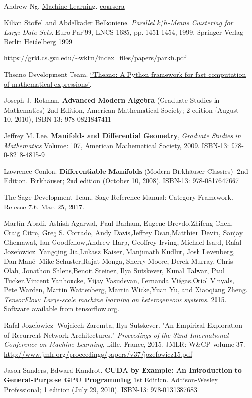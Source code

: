 \documentclass[10pt]{amsart}
\begin{document}
\begin{thebibliography}{9}
Andrew Ng.  \href{https://www.coursera.org/learn/machine-learning/home/welcome}{Machine Learning}.  \href{https://www.coursera.org}{coursera}


Kilian Stoffel and Abdelkader Belkoniene.  \emph{Parallel $k/h$-Means Clustering for Large Data Sets}.  Euro-Par'99, LNCS 1685, pp. 1451-1454, 1999.  Springer-Verlag Berlin Heidelberg 1999

\url{https://grid.cs.gsu.edu/~wkim/index_files/papers/parkh.pdf}

Theano Development Team. \href{http://arxiv.org/pdf/1605.02688.pdf}{“Theano: A Python framework for fast computation of mathematical expressions”}. 

Joseph J. Rotman, \textbf{Advanced Modern Algebra} (Graduate Studies in Mathematics) 2nd Edition, American Mathematical Society; 2 edition (August 10, 2010), ISBN-13: 978-0821847411

Jeffrey M. Lee. \textbf{Manifolds and Differential Geometry}, \emph{Graduate Studies in Mathematics} Volume: 107, American Mathematical Society, 2009. ISBN-13: 978-0-8218-4815-9

Lawrence Conlon.  \textbf{Differentiable Manifolds} (Modern Birkhäuser Classics).  2nd Edition.  Birkhäuser; 2nd edition (October 10, 2008).  ISBN-13: 978-0817647667

The Sage Development Team.  Sage Reference Manual: Category Framework.  Release 7.6.  Mar. 25, 2017.  

Martín Abadi, Ashish Agarwal, Paul Barham, Eugene Brevdo,Zhifeng Chen, Craig Citro, Greg S. Corrado, Andy Davis,Jeffrey Dean,Matthieu Devin, Sanjay Ghemawat, Ian Goodfellow,Andrew Harp, Geoffrey Irving, Michael Isard, Rafal Jozefowicz, Yangqing Jia,Lukasz Kaiser, Manjunath Kudlur, Josh Levenberg, Dan Mané, Mike Schuster,Rajat Monga, Sherry Moore, Derek Murray, Chris Olah, Jonathon Shlens,Benoit Steiner, Ilya Sutskever, Kunal Talwar, Paul Tucker,Vincent Vanhoucke, Vijay Vasudevan, Fernanda Viégas,Oriol Vinyals, Pete Warden, Martin Wattenberg, Martin Wicke,Yuan Yu, and Xiaoqiang Zheng.  
\emph{TensorFlow: Large-scale machine learning on heterogeneous systems}, 2015. Software available from \href{http://tensorflow.org/}{tensorflow.org.}

Rafal Jozefowicz, Wojciech Zaremba, Ilya Sutskever.  "An Empirical Exploration of Recurrent Network Architectures."  \emph{Proceedings of the 32nd
International  Conference on  Machine Learning}, Lille, France, 2015.  JMLR: W\&CP volume 37.  \url{http://www.jmlr.org/proceedings/papers/v37/jozefowicz15.pdf} 

Jason Sanders, Edward Kandrot.  \textbf{CUDA by Example: An Introduction to General-Purpose GPU Programming} 1st Edition.  Addison-Wesley Professional; 1 edition (July 29, 2010).  ISBN-13: 978-0131387683
  
\end{thebibliography}
\end{document}

